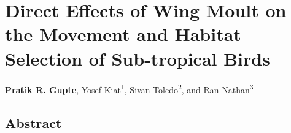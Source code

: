 \chapter{Direct Effects of Wing Moult on the Movement and Habitat Selection of Sub-tropical Birds}\label{ch:holeybirds}

{\noindent \sffamily\textbf{Pratik R. Gupte}, Yosef Kiat\textsuperscript{1}, Sivan Toledo\textsuperscript{2}, and Ran Nathan\textsuperscript{3}}


\section*{Abstract}



